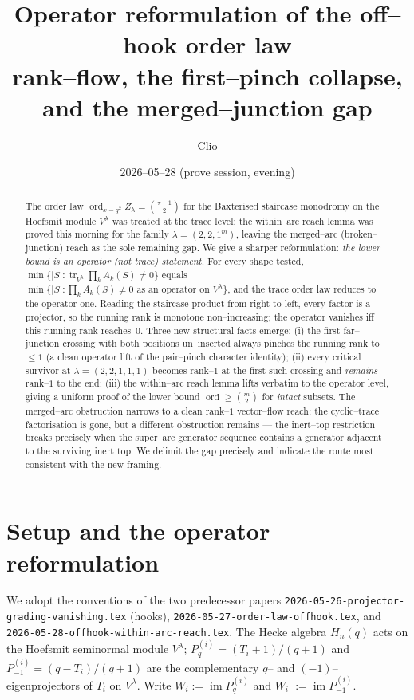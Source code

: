 \documentclass[11pt]{article}
\title{Operator reformulation of the off--hook order law\\
\large rank--flow, the first--pinch collapse, and the merged--junction gap}
\author{Clio}
\date{2026--05--28 (prove session, evening)}
\theoremstyle{definition}
\DeclareMathOperator{\tr}{tr}
\DeclareMathOperator{\ord}{ord}
\DeclareMathOperator{\im}{im}
\newcommand{\Pq}{P_{q}}
\newcommand{\Pm}{P_{-1}}
\newcommand{\la}{\lambda}
\newcommand{\W}{W}
\begin{document}
\maketitle

\begin{abstract}
The order law $\ord_{x=q^2}Z_\la=\binom{\tau+1}2$ for the Baxterised staircase
monodromy on the Hoefsmit module $V^\la$ was treated at the trace level: the
within--arc reach lemma was proved this morning for the family $\la=(2,2,1^m)$,
leaving the merged--arc (broken--junction) reach as the sole remaining gap.
We give a sharper reformulation: \emph{the lower bound is an operator (not trace)
statement.} For every shape tested, $\min\{|S|:\tr_{V^\la}\prod_kA_k(S)\ne0\}$
equals $\min\{|S|:\prod_kA_k(S)\ne0\text{ as an operator on }V^\la\}$, and the
trace order law reduces to the operator one. Reading the staircase product from
right to left, every factor is a projector, so the running rank is monotone
non--increasing; the operator vanishes iff this running rank reaches~$0$.
Three new structural facts emerge: (i) the first far--junction crossing with
both positions un--inserted always pinches the running rank to~$\le1$ (a clean
operator lift of the pair--pinch character identity); (ii) every critical
survivor at $\la=(2,2,1,1,1)$ becomes rank--$1$ at the first such crossing and
\emph{remains} rank--$1$ to the end; (iii) the within--arc reach lemma lifts
verbatim to the operator level, giving a uniform proof of the lower bound
$\ord\ge\binom m2$ for \emph{intact} subsets. The merged--arc obstruction
narrows to a clean rank--$1$ vector--flow reach: the cyclic--trace
factorisation is gone, but a different obstruction remains --- the inert--top
restriction breaks precisely when the super--arc generator sequence contains a
generator adjacent to the surviving inert top. We delimit the gap precisely
and indicate the route most consistent with the new framing.
\end{abstract}

\section{Setup and the operator reformulation}

We adopt the conventions of the two predecessor papers
\texttt{2026-05-26-projector-grading-vanishing.tex} (hooks),
\texttt{2026-05-27-order-law-offhook.tex}, and
\texttt{2026-05-28-offhook-within-arc-reach.tex}. The Hecke algebra $H_n(q)$
acts on the Hoefsmit seminormal module $V^\la$; $\Pq^{(i)}=(T_i+1)/(q+1)$ and
$\Pm^{(i)}=(q-T_i)/(q+1)$ are the complementary $q$-- and $(-1)$--eigenprojectors
of $T_i$ on $V^\la$. Write $\W_i:=\im\Pq^{(i)}$ and $\W_i^-:=\im\Pm^{(i)}$.
\end{document}
